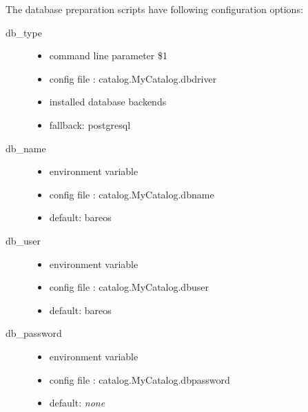The database preparation scripts have following configuration options:

\begin{description}
    \item[db\_type] \hfill
        \begin{itemize}
            \item command line parameter \$1
            \item config file \configFileDirUnix: catalog.MyCatalog.dbdriver
            \item installed database backends
            \item fallback: postgresql
        \end{itemize}
    \item[db\_name] \hfill
        \begin{itemize}
            \item environment variable 
            \item config file \configFileDirUnix: catalog.MyCatalog.dbname
            \item default: bareos
        \end{itemize}
    \item[db\_user] \hfill
        \begin{itemize}
            \item environment variable 
            \item config file \configFileDirUnix: catalog.MyCatalog.dbuser
            \item default: bareos
        \end{itemize}
    \item[db\_password] \hfill
        \begin{itemize}
            \item environment variable 
            \item config file \configFileDirUnix: catalog.MyCatalog.dbpassword
            \item default: \textit{none}
        \end{itemize}
\end{description}

